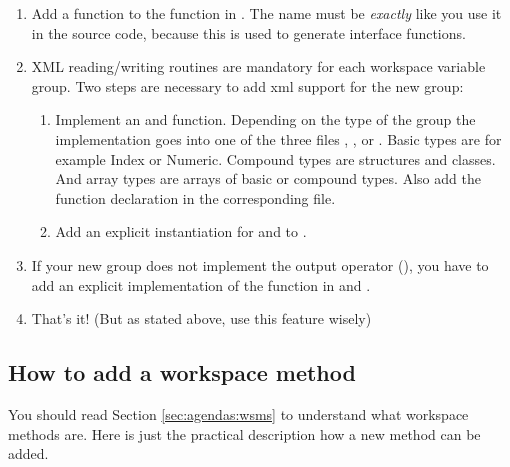 \begin{enumerate}
\item Add a  function to
  the function  in .
  The name must be \emph{exactly} like you use it in the source code,
  because this is used to generate interface functions.
\item XML reading/writing routines are mandatory for each workspace variable
  group. Two steps are necessary to add xml support for the new group:
  \begin{enumerate}
  \item Implement an 
    and  function. Depending
    on the type of the group the implementation goes into one
    of the three files ,
    , or
    . Basic types are for example Index
    or Numeric. Compound types are structures and classes. And array types are
    arrays of basic or compound types. Also add the function declaration in the
    corresponding  file.
  \item Add an explicit instantiation for
     and
     to .
  \end{enumerate}
\item If your new group does not implement the output operator
  (), you have to add an explicit implementation
  of the  function in  and
  .
\item That's it! (But as stated above, use this feature wisely)
\end{enumerate}



\subsection{How to add a workspace method}
\label{sec:development:extending:wsm}

You should read Section \ref{sec:agendas:wsms} to understand what workspace
methods are. Here is just the practical description how a new
method can be added.

